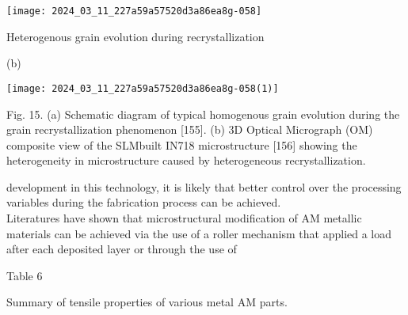 \documentclass[10pt]{article}
\begin{document}
\begin{center}
\texttt{[image: 2024\_03\_11\_227a59a57520d3a86ea8g-058]}
\end{center}

Heterogenous grain evolution during recrystallization

(b)

\begin{center}
\texttt{[image: 2024\_03\_11\_227a59a57520d3a86ea8g-058(1)]}
\end{center}

Fig. 15. (a) Schematic diagram of typical homogenous grain evolution during the grain recrystallization phenomenon [155]. (b) 3D Optical Micrograph (OM) composite view of the SLMbuilt IN718 microstructure [156] showing the heterogeneity in microstructure caused by heterogeneous recrystallization.

development in this technology, it is likely that better control over the processing variables during the fabrication process can be achieved.\\
Literatures have shown that microstructural modification of AM metallic materials can be achieved via the use of a roller mechanism that applied a load after each deposited layer or through the use of

Table 6

Summary of tensile properties of various metal AM parts.
\end{document}
